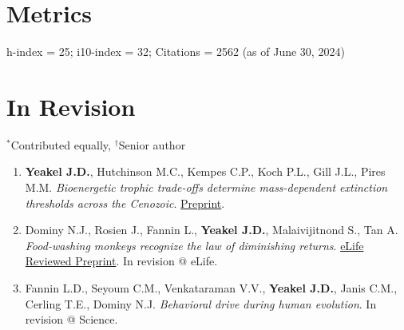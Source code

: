 \documentclass[margin,line,12pt]{res}
\newcommand\reverselabel[1]{%
  \def\theenumi{}%
  \renewcommand\makelabel{\makebox[\dimexpr\labelwidth-3pt\relax][r]{%
    \the\numexpr#1-\value{enumi}+1\relax}}}%
\begin{document}
\begin{resume}
\begin{itemize}



\end{itemize}

\clearpage

\section{\sc Metrics}
h-index = 25; i10-index = 32; Citations = 2562 (as of June 30, 2024)







\section{\sc In Revision}
{\footnotesize{${}^\ast$Contributed equally, ${}^\dag$Senior author}}
\begin{enumerate}
  \reverselabel{44}
\item \textbf{Yeakel J.D.}, Hutchinson M.C., Kempes C.P., Koch P.L., Gill J.L., Pires M.M. \emph{Bioenergetic trophic trade-offs determine mass-dependent extinction thresholds across the Cenozoic}. \href{http://arxiv.org/abs/2410.18849}{Preprint}.
\item Dominy N.J., Rosien J., Fannin L., \textbf{Yeakel J.D.}, Malaivijitnond S., Tan A. \emph{Food-washing monkeys recognize the law of diminishing returns}. \href{https://elifesciences.org/reviewed-preprints/98520#}{eLife Reviewed Preprint}. In revision @ eLife.
\item Fannin L.D., Seyoum C.M., Venkataraman V.V., \textbf{Yeakel J.D.}, Janis C.M., Cerling T.E., Dominy N.J. \emph{Behavioral drive during human evolution}. In revision @ Science.
\end{enumerate}



\end{resume}
\end{document}
